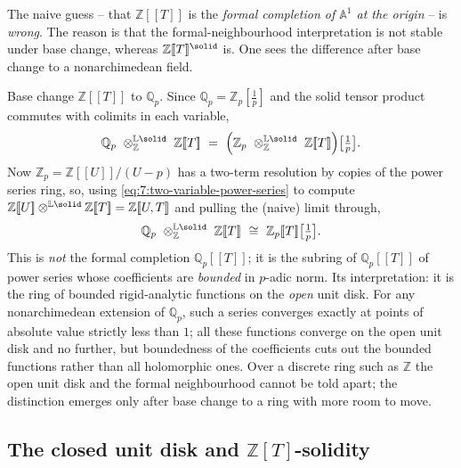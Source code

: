 The naive guess -- that $\mathbb{Z}[\![T]\!]$ is the \emph{formal completion
of $\mathbb{A}^1$ at the origin} -- is \emph{wrong}. The reason is that the
formal-neighbourhood interpretation is not stable under base change, whereas
$\mathbb{Z}[\![T]\!]^{\solid}$ is. One sees the difference after base change to
a nonarchimedean field.

\begin{example}
\label{ex:7:open-disk-Qp}
Base change $\mathbb{Z}[\![T]\!]$ to $\mathbb{Q}_p$. Since
$\mathbb{Q}_p=\mathbb{Z}_p[\tfrac1p]$ and the solid tensor product commutes
with colimits in each variable,
\begin{equation*}
\mathbb{Q}_p\ \otimes^{\mathbb{L}\solid}_{\mathbb{Z}}\ \mathbb{Z}[\![T]\!]
\ =\ \Bigl(\mathbb{Z}_p\ \otimes^{\mathbb{L}\solid}_{\mathbb{Z}}\
\mathbb{Z}[\![T]\!]\Bigr)\bigl[\tfrac1p\bigr].
\end{equation*}
Now $\mathbb{Z}_p=\mathbb{Z}[\![U]\!]/(U-p)$ has a two-term resolution by
copies of the power series ring, so, using
\eqref{eq:7:two-variable-power-series} to compute
$\mathbb{Z}[\![U]\!]\otimes^{\mathbb{L}\solid}\mathbb{Z}[\![T]\!]
=\mathbb{Z}[\![U,T]\!]$ and pulling the (naive) limit through,
\begin{equation*}
\mathbb{Q}_p\ \otimes^{\mathbb{L}\solid}_{\mathbb{Z}}\ \mathbb{Z}[\![T]\!]
\ \cong\ \mathbb{Z}_p[\![T]\!]\bigl[\tfrac1p\bigr].
\end{equation*}
This is \emph{not} the formal completion $\mathbb{Q}_p[\![T]\!]$; it is the
subring of $\mathbb{Q}_p[\![T]\!]$ of power series whose coefficients are
\emph{bounded} in $p$-adic norm. Its interpretation: it is the ring of bounded
rigid-analytic functions on the \emph{open} unit disk. For any nonarchimedean
extension of $\mathbb{Q}_p$, such a series converges exactly at points of
absolute value strictly less than $1$; all these functions converge on the
open unit disk and no further, but boundedness of the coefficients cuts out the
bounded functions rather than all holomorphic ones. Over a discrete ring such
as $\mathbb{Z}$ the open unit disk and the formal neighbourhood cannot be told
apart; the distinction emerges only after base change to a ring with more room
to move.
\end{example}

\subsection{The closed unit disk and \texorpdfstring{$\mathbb{Z}[T]$}{Z[T]}-solidity}

